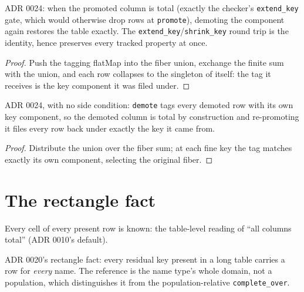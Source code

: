 \begin{theorem}
  \label{thm:demote-promote}\leanok
  ADR 0024: when the promoted column is total (exactly the checker's
  \texttt{extend\_key} gate, which would otherwise drop rows at
  \texttt{promote}), demoting the component again restores the table
  exactly.  The \texttt{extend\_key}/\texttt{shrink\_key} round trip is
  the identity, hence preserves every tracked property at once.
\end{theorem}
\begin{proof}\leanok
  Push the tagging flatMap into the fiber union, exchange the finite sum with
  the union, and each row collapses to the singleton of itself: the tag
  it receives is the key component it was filed under.
\end{proof}

\begin{theorem}
  \label{thm:promote-demote}\leanok
  ADR 0024, with no side condition: \texttt{demote} tags every demoted
  row with its own key component, so the demoted column is total by
  construction and re-promoting it files every row back under exactly
  the key it came from.
\end{theorem}
\begin{proof}\leanok
  Distribute the union over the fiber sum; at each fine key the tag
  matches exactly its own component, selecting the original fiber.
\end{proof}

\chapter{The rectangle fact}

\begin{definition}
  \label{def:total}\leanok
  Every cell of every present row is known: the table-level reading of
  ``all columns total'' (ADR 0010's default).
\end{definition}

\begin{definition}
  \label{def:exhaustive}\leanok
  ADR 0020's rectangle fact: every residual key present in a long table
  carries a row for \emph{every} name.  The reference is the name type's
  whole domain, not a population, which distinguishes it from the
  population-relative \texttt{complete\_over}.
\end{definition}

